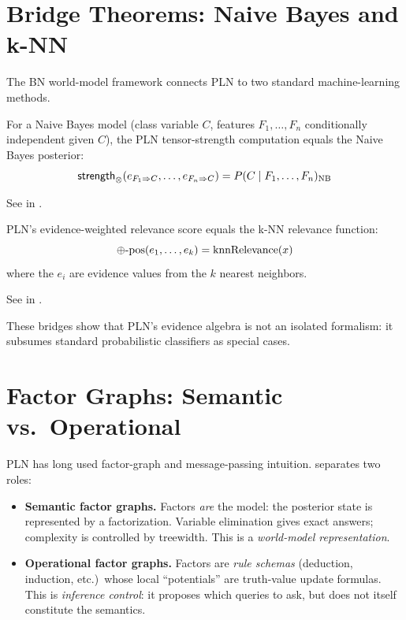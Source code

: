 \documentclass[11pt,openany]{report}
\begin{document}
\section{Bridge Theorems: Naive Bayes and k-NN}

The BN world-model framework connects PLN to two standard machine-learning
methods.

\begin{theorem}
\label{thm:nb-bridge}
For a Naive Bayes model (class variable $C$, features $F_1, \ldots, F_n$
conditionally independent given $C$), the PLN tensor-strength computation
equals the Naive Bayes posterior:
\[
  \mathsf{strength}_{\otimes}(e_{F_1 \Rightarrow C}, \ldots, e_{F_n \Rightarrow C})
  = P(C \mid F_1, \ldots, F_n)_{\mathrm{NB}}
\]
\end{theorem}

See  in
.

\begin{theorem}
\label{thm:knn-bridge}
PLN's evidence-weighted relevance score equals the k-NN relevance
function:
\[
  \oplus\text{-}\mathrm{pos}(e_1, \ldots, e_k) = \mathrm{knnRelevance}(x)
\]
where the $e_i$ are evidence values from the $k$ nearest neighbors.
\end{theorem}

See  in
.

These bridges show that PLN's evidence algebra is not an isolated
formalism: it subsumes standard probabilistic classifiers as special
cases.

\section{Factor Graphs: Semantic vs.\ Operational}
\label{sec:factor-graphs}

PLN has long used factor-graph and message-passing intuition.  \xiPLN{}
separates two roles:

\begin{itemize}
\item \textbf{Semantic factor graphs.}  Factors \emph{are} the model:
  the posterior state is represented by a factorization.  Variable
  elimination gives exact answers; complexity is controlled by treewidth.
  This is a \emph{world-model representation}.

\item \textbf{Operational factor graphs.}  Factors are \emph{rule schemas}
  (deduction, induction, etc.)\ whose local ``potentials'' are truth-value
  update formulas.  This is \emph{inference control}: it proposes which
  queries to ask, but does not itself constitute the semantics.
\end{itemize}
\end{document}
